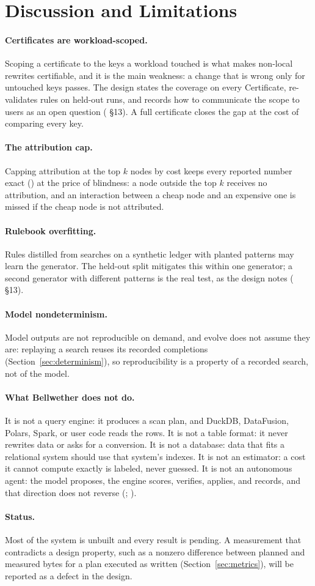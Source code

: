 \section{Discussion and Limitations}\label{sec:discussion}

\paragraph{Certificates are workload-scoped.} Scoping a certificate to the keys
a workload touched is what makes non-local rewrites certifiable, and it is the
main weakness: a change that is wrong only for untouched keys passes. The
design states the coverage on every Certificate, re-validates rules on held-out
runs, and records how to communicate the scope to users as an open question
( \S13). A full certificate closes the gap at the cost of
comparing every key.

\paragraph{The attribution cap.} Capping attribution at the top $k$ nodes by
cost keeps every reported number exact () at the price of blindness: a
node outside the top $k$ receives no attribution, and an interaction between a
cheap node and an expensive one is missed if the cheap node is not attributed.

\paragraph{Rulebook overfitting.} Rules distilled from searches on a synthetic
ledger with planted patterns may learn the generator. The held-out split
mitigates this within one generator; a second generator with different patterns
is the real test, as the design notes ( \S13).

\paragraph{Model nondeterminism.} Model outputs are not reproducible on demand,
and evolve does not assume they are: replaying a search reuses its recorded
completions (Section~\ref{sec:determinism}), so reproducibility is a property
of a recorded search, not of the model.

\paragraph{What Bellwether does not do.} It is not a query engine: it produces a
scan plan, and DuckDB, DataFusion, Polars, Spark, or user code reads the rows.
It is not a table format: it never rewrites data or asks for a conversion. It is
not a database: data that fits a relational system should use that system's
indexes. It is not an estimator: a cost it cannot compute exactly is labeled,
never guessed. It is not an autonomous agent: the model proposes, the engine
scores, verifies, applies, and records, and that direction does not reverse
(; ).

\paragraph{Status.} Most of the system is unbuilt and every result is pending.
A measurement that contradicts a design property, such as a nonzero difference
between planned and measured bytes for a plan executed as written
(Section~\ref{sec:metrics}), will be reported as a defect in the design.
